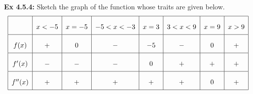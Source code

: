 \begin{tcolorbox}[example]
    \textbf{Ex 4.5.4: } Sketch the graph of the function whose traits are given below. \begin{align*}
        \arraycolsep=5.5pt\def\arraystretch{2.2}
        \begin{array}{|c|c|c|c|c|c|c|c|}
            \hline
            & x < -5 & x = -5 & -5 < x < -3 & x = 3 & 3 < x < 9 & x = 9 & x > 9 \\ \hline
            f(x) & + & 0 & - & -5 & - & 0 & + \\ \hline
            f'(x) & - & - & - & 0 & + & + & + \\ \hline
            f''(x) & + & + & + & + & + & 0 & + \\
            \hline
        \end{array}
    \end{align*}
\end{tcolorbox}
